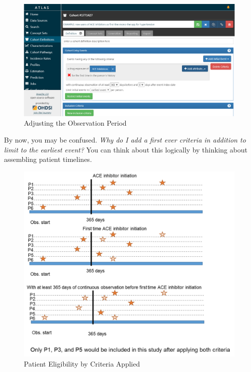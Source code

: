 \documentclass[11pt]{book}
\theoremstyle{definition}
\theoremstyle{definition}
\theoremstyle{definition}
\theoremstyle{remark}
\begin{document}
\begin{figure}

{\centering \includegraphics[width=0.9\linewidth]{images/Cohorts/ATLAS-lookback} 

}

\caption{Adjusting the Observation Period}\label{fig:ATLASlookback}
\end{figure}

By now, you may be confused. \emph{Why do I add a first ever criteria in addition to limit to the earliest event?} You can think about this logically by thinking about assembling patient timelines.

\begin{figure}

{\centering \includegraphics[width=0.9\linewidth]{images/Cohorts/EarliestEventExplained} 

}

\caption{Patient Eligibility by Criteria Applied}\label{fig:EarliestEventExplained}
\end{figure}
\end{document}

